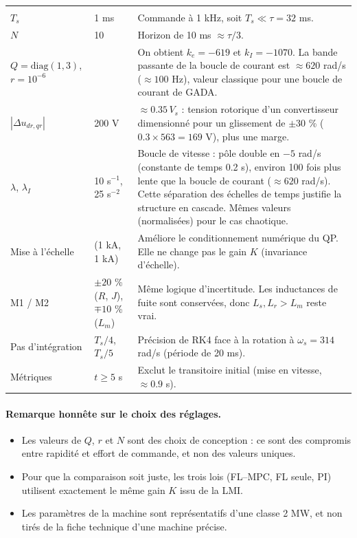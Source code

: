 \documentclass[11pt,a4paper]{article}
\begin{document}
\begin{longtable}{>{\raggedright}p{3.3cm}p{2.3cm}p{9.6cm}}
\midrule
\multicolumn{3}{l}{\textbf{Poursuite MPPT (partie 3)}}\\
$T_s$ & 1 ms & Commande à 1 kHz, soit $T_s\ll\tau=32$ ms.\\
$N$ & 10 & Horizon de 10 ms $\approx\tau/3$.\\
$Q=\mathrm{diag}(1,3)$, $r=10^{-6}$ & & On obtient $k_e=-619$ et $k_I=-1070$. La bande passante de la boucle de courant est $\approx620$ rad/s ($\approx100$ Hz), valeur classique pour une boucle de courant de GADA.\\
$|\Delta u_{dr,qr}|$ & 200 V & $\approx0.35\,V_s$ : tension rotorique d'un convertisseur dimensionné pour un glissement de $\pm30$ \% ($0.3\times563=169$ V), plus une marge.\\
$\lambda$, $\lambda_I$ & 10 s$^{-1}$, 25 s$^{-2}$ & Boucle de vitesse : pôle double en $-5$ rad/s (constante de temps 0.2 s), environ 100 fois plus lente que la boucle de courant ($\approx620$ rad/s). Cette séparation des échelles de temps justifie la structure en cascade. Mêmes valeurs (normalisées) pour le cas chaotique.\\
Mise à l'échelle & (1 kA, 1 kA) & Améliore le conditionnement numérique du QP. Elle ne change pas le gain $K$ (invariance d'échelle).\\
M1 / M2 & $\pm20$ \% ($R$, $J$), $\mp10$ \% ($L_m$) & Même logique d'incertitude. Les inductances de fuite sont conservées, donc $L_s,L_r>L_m$ reste vrai.\\
Pas d'intégration & $T_s/4$, $T_s/5$ & Précision de RK4 face à la rotation à $\omega_s=314$ rad/s (période de 20 ms).\\
Métriques & $t\ge5$ s & Exclut le transitoire initial (mise en vitesse, $\approx0.9$ s).\\
\bottomrule
\end{longtable}
\normalsize

\paragraph{Remarque honnête sur le choix des réglages.}
\begin{itemize}
\item Les valeurs de $Q$, $r$ et $N$ sont des choix de conception : ce sont des compromis entre rapidité et effort de commande, et non des valeurs uniques.
\item Pour que la comparaison soit juste, les trois lois (FL--MPC, FL seule, PI) utilisent exactement le même gain $K$ issu de la LMI.
\item Les paramètres de la machine sont représentatifs d'une classe 2 MW, et non tirés de la fiche technique d'une machine précise.
\end{itemize}
\end{document}
